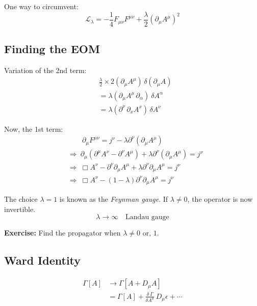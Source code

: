 \documentclass[14pt]{article} %
\begin{document}
One way to circumvent:
\[
\mathcal{L}_\lambda
= -\frac14 F_{\mu\nu} F^{\mu\nu}
+ \frac{\lambda}{2} (\partial_\mu A^\mu)^2
\]


\subsection{Finding the EOM}
Variation of the 2nd term:
\begin{align*}
& \frac{\lambda}{2} \times 2 (\partial_\mu A^\mu) \, \delta(\partial_\mu A)
\\
&= \lambda (\partial_\mu A^\mu \, \partial_\alpha) \ \delta A^\alpha
\\
&= \lambda (\partial^\nu \, \partial_x A^x)\, \delta A^\nu
\end{align*}

Now, the 1st term:
\begin{align*}
& \qquad\partial_\mu F^{\mu\nu}
= j^\nu - \lambda \partial^\nu (\partial_\mu A^\mu)
\\
&\Rightarrow~ \partial_\mu
\left( \partial^\mu A^\nu - \partial^\nu A^\mu \right)
+ \lambda \partial^\nu (\partial_\mu A^\mu)
= j^\nu
\\
&\Rightarrow~ \Box A^\nu
- \partial^\nu \partial_\mu A^\mu
+ \lambda \partial^\nu \partial_\mu A^\mu
= j^\nu
\\
&\Rightarrow~ \Box A^\nu
- (1-\lambda)\partial^\nu \partial_\mu A^\mu
= j^\nu
\end{align*}

The choice $\lambda = 1$ is known as the \textit{Feynman gauge}.  
If $\lambda \neq 0$, the operator is now invertible.
\[
\lambda \to \infty \quad \text{Landau gauge}
\]
\begin{tcolorbox}
\textbf{Exercise:} Find the propagator when $\lambda \neq 0 \text{ or, } 1$.
\end{tcolorbox}

\subsection{Ward Identity}
\begin{align*}
\Gamma[A] &\to \Gamma[A + D_\mu A]
\\
&= \Gamma[A]
+ \frac{\delta \ \Gamma}{\delta A^\mu} \, D_\mu \epsilon
+ \cdots
\end{align*}
\end{document}
